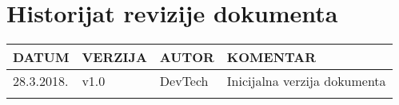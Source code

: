 \chapter*{Historijat revizije dokumenta}
\begin{center}
    \begin{tabular}{|l|l|l|l|}
        \hline
        \rowcolor[HTML]{FE996B} 
        DATUM & VERZIJA & AUTOR & KOMENTAR \\ \hline
        28.3.2018. & v1.0 & DevTech & Inicijalna verzija dokumenta          \\ \hline
              &         &       &          \\ \hline
    \end{tabular}
\end{center}
